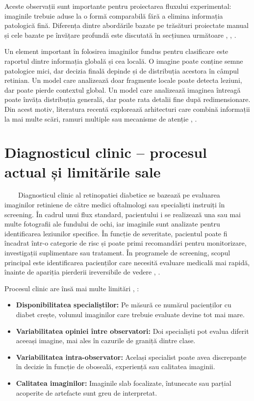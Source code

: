 \documentclass[12pt, a4paper, twoside, romanian]{teza-upb}
\begin{document}
Aceste observații sunt importante pentru proiectarea fluxului experimental: imaginile trebuie aduse
la o formă comparabilă fără a elimina informația patologică fină. Diferența dintre
abordările bazate pe trăsături proiectate manual și cele bazate pe învățare profundă este
discutată în secțiunea următoare
\cite{1_niemeijer2005automatic}, \cite{2_sopharak2009automatic}, \cite{4_pratt2016convolutional}.
\bigskip

Un element important în folosirea imaginilor fundus pentru clasificare este raportul dintre
informația globală și cea locală. O imagine poate conține semne patologice mici,
dar decizia finală depinde și de distribuția acestora în câmpul retinian. Un
model care analizează doar fragmente locale poate detecta leziuni, dar poate pierde
contextul global. Un model care analizează imaginea întreagă poate învăța distribuția generală,
dar poate rata detalii fine după redimensionare. Din acest motiv, literatura recentă
explorează arhitecturi care combină informații la mai multe scări, ramuri multiple sau
mecanisme de atenție \cite{11_shakibania2024dual}, \cite{7_huang2022rtnet}.

\section{Diagnosticul clinic -- procesul actual și limitările sale}

\ \ \ \ Diagnosticul clinic al retinopatiei diabetice se bazează pe evaluarea imaginilor retiniene de
către medici oftalmologi sau specialiști instruiți în screening. În cadrul unui flux
standard, pacientului i se realizează una sau mai multe fotografii ale fundului
de ochi, iar imaginile sunt analizate pentru identificarea leziunilor specifice. În funcție
de severitate, pacientul poate fi încadrat într-o categorie de risc și poate
primi recomandări pentru monitorizare, investigații suplimentare sau tratament. În programele de screening,
scopul principal este identificarea pacienților care necesită evaluare medicală mai rapidă, înainte
de apariția pierderii ireversibile de vedere \cite{3_gulshan2016development}, \cite{15_li2019diagnostic}.
\bigskip

Procesul clinic are însă mai multe limitări \cite{3_gulshan2016development}, \cite{14_liu2022deepdrid}:

\begin{itemize}
  \item \textbf{Disponibilitatea specialiștilor:} Pe măsură ce numărul pacienților cu diabet crește, volumul imaginilor
    care trebuie evaluate devine tot mai mare.
  \item \textbf{Variabilitatea opiniei între observatori:} Doi specialiști pot evalua diferit aceeași imagine, mai ales în
    cazurile de graniță dintre clase.
  \item \textbf{Variabilitatea intra-observator:} Același specialist poate avea discrepanțe în decizie în funcție de
    oboseală, experiență sau calitatea imaginii.
  \item \textbf{Calitatea imaginilor:} Imaginile slab focalizate, întunecate sau parțial acoperite de artefacte sunt greu de interpretat.
\end{itemize}
\bigskip
\end{document}
